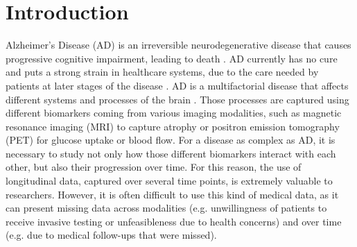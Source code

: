 \section{Introduction}

Alzheimer's Disease (AD) is an irreversible neurodegenerative disease that causes progressive cognitive impairment, leading to death \cite{Lane2018}. AD currently has no cure and puts a strong strain in healthcare systems, due to the care needed by patients at later stages of the disease \cite{AlzheimersAssociation}. AD is a multifactorial disease that affects different systems and processes of the brain \cite{Jack2010}. Those processes are captured using different biomarkers coming from various imaging modalities, such as magnetic resonance imaging (MRI) to capture atrophy or positron emission tomography (PET) for glucose uptake or blood flow. For a disease as complex as AD, it is necessary to study not only how those different biomarkers interact with each other, but also their progression over time. For this reason, the use of longitudinal data, captured over several time points, is extremely valuable to researchers. However, it is often difficult to use this kind of medical data, as it can present missing data across modalities (e.g. unwillingness of patients to receive invasive testing or unfeasibleness due to health concerns) and over time (e.g. due to medical follow-ups that were missed). \\

